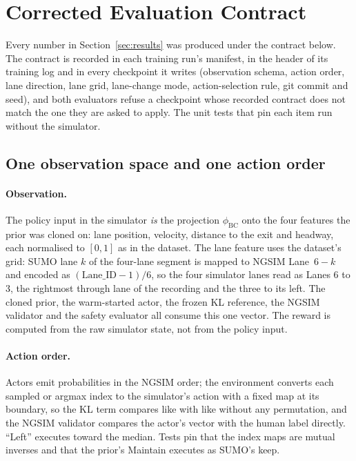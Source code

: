 \section{Corrected Evaluation Contract}
\label{sec:contract}

Every number in Section~\ref{sec:results} was produced under the contract below. The contract is recorded in each training run's manifest, in the header of its training log and in every checkpoint it writes (observation schema, action order, lane direction, lane grid, lane-change mode, action-selection rule, git commit and seed), and both evaluators refuse a checkpoint whose recorded contract does not match the one they are asked to apply. The unit tests that pin each item run without the simulator.

\subsection{One observation space and one action order}
\label{sec:contract_obs}

\paragraph{Observation.}
The policy input in the simulator \emph{is} the projection $\phi_{\mathrm{BC}}$ onto the four features the prior was cloned on: lane position, velocity, distance to the exit and headway, each normalised to $[0,1]$ as in the dataset. The lane feature uses the dataset's grid: SUMO lane $k$ of the four-lane segment is mapped to NGSIM Lane~$6-k$ and encoded as $(\mathrm{Lane\_ID}-1)/6$, so the four simulator lanes read as Lanes 6 to 3, the rightmost through lane of the recording and the three to its left. The cloned prior, the warm-started actor, the frozen KL reference, the NGSIM validator and the safety evaluator all consume this one vector. The reward is computed from the raw simulator state, not from the policy input.

\paragraph{Action order.}
Actors emit probabilities in the NGSIM order; the environment converts each sampled or argmax index to the simulator's action with a fixed map at its boundary, so the KL term compares like with like without any permutation, and the NGSIM validator compares the actor's vector with the human label directly. ``Left'' executes toward the median. Tests pin that the index maps are mutual inverses and that the prior's Maintain executes as SUMO's keep.

